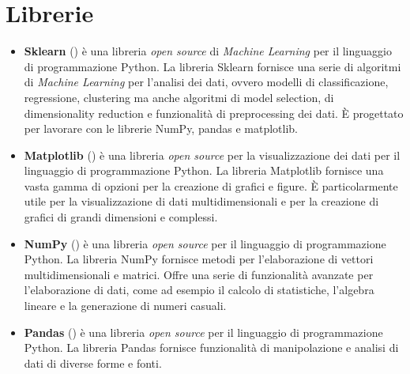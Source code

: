 \section{Librerie}\label{cap:importPy}
\begin{itemize}
	\item \textbf{Sklearn} (\textit{\cite{sklearn}}) è una libreria \emph{open source} di \emph{Machine Learning} per il linguaggio di programmazione Python. La libreria Sklearn fornisce una serie di algoritmi di \emph{Machine Learning} per l'analisi dei dati, ovvero modelli di classificazione, regressione, clustering ma anche algoritmi di model selection, di dimensionality reduction e funzionalità di preprocessing dei dati. È progettato per lavorare con le librerie NumPy, pandas e matplotlib.
	\item \textbf{Matplotlib} (\textit{\cite{matplotlib}}) è una libreria \emph{open source} per la visualizzazione dei dati per il linguaggio di programmazione Python. La libreria Matplotlib fornisce una vasta gamma di opzioni per la creazione di grafici e figure. È particolarmente utile per la visualizzazione di dati multidimensionali e per la creazione di grafici di grandi dimensioni e complessi. 
	\item \textbf{NumPy} (\textit{\cite{numPy}}) è una libreria \emph{open source} per il linguaggio di programmazione Python. La libreria NumPy fornisce metodi per l'elaborazione di vettori multidimensionali e matrici. Offre una serie di funzionalità avanzate per l'elaborazione di dati, come ad esempio il calcolo di statistiche, l'algebra lineare e la generazione di numeri casuali. 
	\item \textbf{Pandas} (\textit{\cite{pandas}}) è una libreria \emph{open source} per il linguaggio di programmazione Python. La libreria Pandas fornisce funzionalità di manipolazione e analisi di dati di diverse forme e fonti.
\end{itemize}